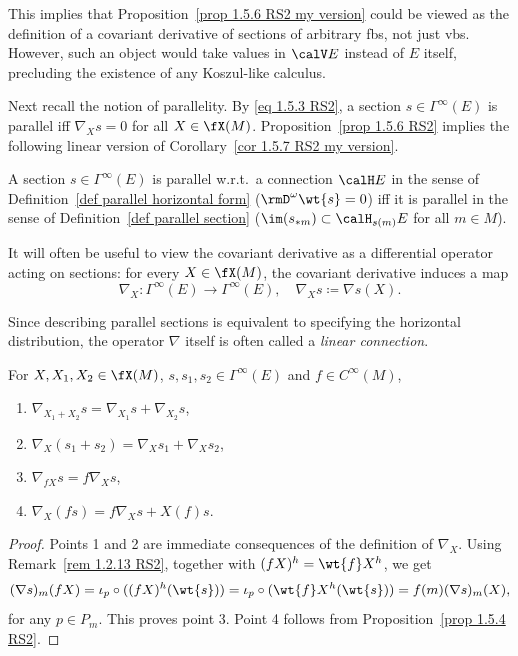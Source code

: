 \begin{rem}
    This implies that Proposition~\ref{prop 1.5.6 RS2 my version} could be viewed as the definition of a covariant derivative of sections of arbitrary \glspl{fb}, not just \glspl{vb}. However, such an object would take values in $\calV E$ instead of $E$ itself, precluding the existence of any Koszul-like calculus.
\end{rem}

Next recall the notion of parallelity. By \eqref{eq 1.5.3 RS2}, a section $s\in\Gamma^\infty(E)$ is parallel iff $\nabla_X s=0$ for all $X\in \fX(M)$. Proposition~\ref{prop 1.5.6 RS2} implies the following linear version of Corollary~\ref{cor 1.5.7 RS2 my version}.

\begin{cor}[{{\cite[Cor.~1.5.7]{RS2}}}]\label{cor 1.5.7 RS2}
    A section $s\in\Gamma^\infty(E)$ is parallel w.r.t.\ a connection $\calH E$ in the sense of Definition~\ref{def parallel horizontal form} ($\rmD^\omega\wt{s}=0$) iff it is parallel in the sense of Definition~\ref{def parallel section} ($\im(s_{\ast m})\subset \calH_{s(m)}E$  for  all $m\in M$).
\end{cor}

It will often be useful to view the covariant derivative as a differential operator acting on sections: for every $X\in\fX(M)$, the covariant derivative induces a map
\[\nabla_X:\Gamma^\infty(E)\to \Gamma^\infty(E),\quad \nabla_X s\coloneqq \nabla s(X).\]

\begin{rem}
    Since describing parallel sections is equivalent to specifying the horizontal distribution, the operator $\nabla$ itself is often called a \emph{linear connection}.
\end{rem}

\begin{prop}[{{\cite[Prop.~1.5.8]{RS2}}}]\label{prop 1.5.8 RS2}
    For $X,X_1,X_2\in\fX(M)$, $s,s_1,s_2\in\Gamma^\infty(E)$ and $f\in C^\infty(M)$,
    \begin{enumerate}
        \item $\nabla_{X_1+X_2}s=\nabla_{X_1}s+\nabla_{X_2}s$,
        \item $\nabla_X(s_1+s_2)=\nabla_X s_1+\nabla_X s_2$,
        \item $\nabla_{fX}s=f\nabla_X s$,
        \item $\nabla_X(fs)=f\nabla_X s+X(f) s$.
    \end{enumerate}
\end{prop}
\begin{proof}
    Points 1 and 2 are immediate consequences of the definition of $\nabla_X$. Using Remark~\ref{rem 1.2.13 RS2}, together with $(fX)^h=\wt{f}X^h$, we get
    \[(\nabla s)_m(fX)=\iota_p\circ ((fX)^h(\wt{s}))=\iota_p\circ (\wt{f}X^h(\wt{s}))=f(m)(\nabla s)_m(X),\]
    for any $p\in P_m$. This proves point 3. Point 4 follows from Proposition~\ref{prop 1.5.4 RS2}.
\end{proof}


